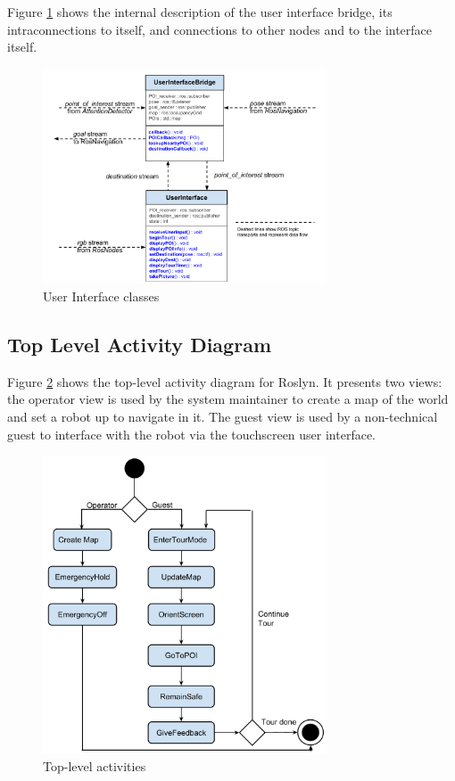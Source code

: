 \documentclass[11pt]{report}
\begin{document}
Figure \ref{fig:user_interface} shows the internal description of the user interface bridge, its intraconnections to itself, and connections to other nodes and to the interface itself.
\begin{figure}[H]
 \centering
 \includegraphics[width=0.75\textwidth]{user_interface.pdf}
 \caption{User Interface classes}
 \label{fig:user_interface}
\end{figure}

\subsection{Top Level Activity Diagram}
Figure \ref{fig:activity_diagram} shows the top-level activity diagram for Roslyn. It presents two views: the operator view is used by the system maintainer to create a map of the world and set a robot up to navigate in it. The guest view is used by a non-technical guest to interface with the robot via the touchscreen user interface.
\begin{figure}[H]
 \centering
 \includegraphics[width=0.75\textwidth]{activity_diagram.pdf}
 \caption{Top-level activities}
 \label{fig:activity_diagram}
\end{figure}
\end{document}

